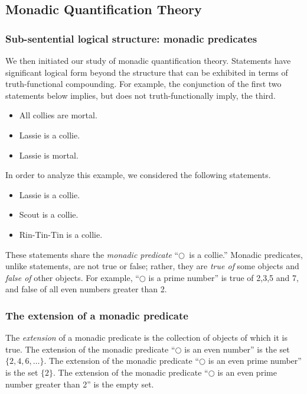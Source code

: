 \subsection{Monadic Quantification Theory}
\subsubsection{Sub-sentential logical structure: monadic predicates}
 
We then initiated our study of monadic quantification theory. Statements have significant logical form beyond the structure that can be
exhibited in terms of truth-functional compounding. For example, the conjunction of the first two statements below implies, but does not truth-functionally imply, the third.
\begin{itemize}
\item All collies are mortal. 
\item Lassie is a collie.
\item Lassie is mortal.
\end{itemize}
In order to analyze this example, we considered the following statements.
\begin{itemize}
\item Lassie is a collie.
\item Scout is a collie.
\item Rin-Tin-Tin is a collie.
\end{itemize}
These statements share the {\em monadic predicate} ``$\bigcirc$\ is a collie.''
Monadic predicates, unlike statements, are not true or false; rather, they are
{\em true of} some objects and {\em false of} other objects.
For example, ``$\bigcirc$ is a prime number'' is true of 2,3,5 and 7, and false of all even
numbers greater than 2.
\subsubsection{The extension of a monadic predicate}

The {\em extension} of a monadic predicate is the collection of objects of
which it is true. The extension of the monadic predicate ``$\bigcirc$ is an even number'' is the
set $\{2,4,6,\ldots \}.$
The extension of the monadic predicate ``$\bigcirc$ is an even prime number''
is the set
 $\{2 \}.$
The extension of the monadic predicate ``$\bigcirc$ is an even prime number
greater than 2''
is the empty set. 

